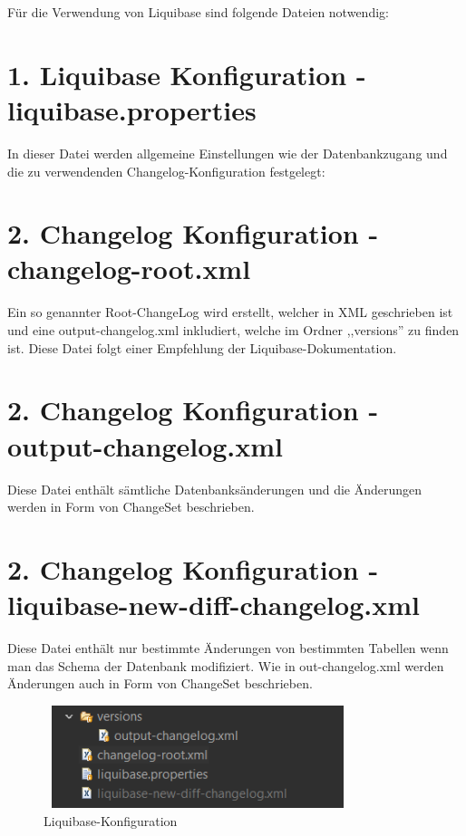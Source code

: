 \documentclass[a4paper,12pt]{scrreprt}
\begin{document}
Für die Verwendung von Liquibase sind folgende Dateien notwendig:
\section*{\small \textbf{1. Liquibase Konfiguration - liquibase.properties}}
In dieser Datei werden allgemeine Einstellungen wie der Datenbankzugang und die zu verwendenden Changelog-Konfiguration festgelegt:
\section*{\small \textbf{2. Changelog Konfiguration - changelog-root.xml}}
Ein so genannter Root-ChangeLog wird erstellt, welcher in XML geschrieben ist und eine output-changelog.xml inkludiert, welche im Ordner ,,versions'' zu finden ist. Diese Datei folgt einer Empfehlung der Liquibase-Dokumentation. 

\section*{\small \textbf{2. Changelog Konfiguration - output-changelog.xml}}
Diese Datei enthält sämtliche Datenbanksänderungen und die Änderungen werden in Form von ChangeSet beschrieben.

\section*{\small \textbf{2. Changelog Konfiguration - liquibase-new-diff-changelog.xml}}
Diese Datei enthält nur bestimmte Änderungen von bestimmten Tabellen wenn man das Schema der Datenbank modifiziert. Wie in out-changelog.xml werden Änderungen auch in Form von ChangeSet beschrieben.


\begin{figure}[h!]
\centering
\includegraphics[width=9cm, height=3cm]{liquibase-changelog.png}
\caption{\label{datenbank:konfiguration} Liquibase-Konfiguration}
\end{figure}



\printbibliography
\end{document}
